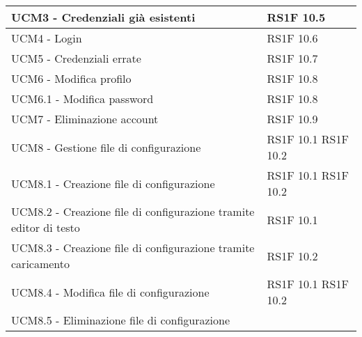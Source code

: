 \begin{center}
\begin{longtable}{ | p{5cm} | p{5cm} |}
            UCM3 - Credenziali già esistenti &  RS1F 10.5 \newline  \\ \hline      
            UCM4 - Login &  RS1F 10.6 \newline  \\ \hline      
            UCM5 - Credenziali errate &  RS1F 10.7 \newline  \\ \hline      
            UCM6 - Modifica profilo &  RS1F 10.8 \newline  \\ \hline      
            UCM6.1 - Modifica password &  RS1F 10.8 \newline  \\ \hline      
            UCM7 - Eliminazione account &  RS1F 10.9 \newline  \\ \hline      
            UCM8 - Gestione file di configurazione &  RS1F 10.1 \newline  RS1F 10.2 \newline  \\ \hline      
            UCM8.1 - Creazione file di configurazione &  RS1F 10.1 \newline  RS1F 10.2 \newline  \\ \hline      
            UCM8.2 - Creazione file di configurazione tramite editor di testo &  RS1F 10.1 \newline  \\ \hline      
            UCM8.3 - Creazione file di configurazione tramite caricamento &  RS1F 10.2 \newline  \\ \hline      
            UCM8.4 - Modifica file di configurazione &  RS1F 10.1 \newline  RS1F 10.2 \newline  \\ \hline      
            UCM8.5 - Eliminazione file di configurazione &  \\ \hline     
      \end{longtable}
      \egroup
      \end{center}  
\clearpage

